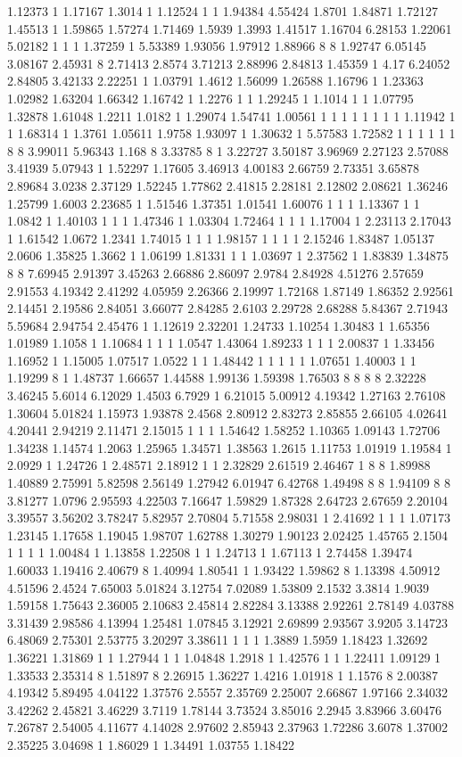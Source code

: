 1.12373 1 1.17167 1.3014 1 1.12524 1 1 1.94384 4.55424 1.8701 1.84871 1.72127 1.45513 1 1.59865 1.57274 1.71469 1.5939 1.3993 1.41517 1.16704 6.28153 1.22061 5.02182 1 1 1 1.37259 1 5.53389 1.93056 1.97912 1.88966 8 8 1.92747 6.05145 3.08167 2.45931 8 2.71413 2.8574 3.71213 2.88996 2.84813 1.45359 1 4.17 6.24052 2.84805 3.42133 2.22251 1 1.03791 1.4612 1.56099 1.26588 1.16796 1 1.23363 1.02982 1.63204 1.66342 1.16742 1 1.2276 1 1 1.29245 1 1.1014 1 1 1.07795 1.32878 1.61048 1.2211 1.0182 1 1.29074 1.54741 1.00561 1 1 1 1 1 1 1 1 1.11942 1 1 1.68314 1 1.3761 1.05611 1.9758 1.93097 1 1.30632 1 5.57583 1.72582 1 1 1 1 1 1 8 8 3.99011 5.96343 1.168 8 3.33785 8 1 3.22727 3.50187 3.96969 2.27123 2.57088 3.41939 5.07943 1 1.52297 1.17605 3.46913 4.00183 2.66759 2.73351 3.65878 2.89684 3.0238 2.37129 1.52245 1.77862 2.41815 2.28181 2.12802 2.08621 1.36246 1.25799 1.6003 2.23685 1 1.51546 1.37351 1.01541 1.60076 1 1 1 1.13367 1 1 1.0842 1 1.40103 1 1 1 1.47346 1 1.03304 1.72464 1 1 1 1.17004 1 2.23113 2.17043 1 1.61542 1.0672 1.2341 1.74015 1 1 1 1.98157 1 1 1 1 2.15246 1.83487 1.05137 2.0606 1.35825 1.3662 1 1.06199 1.81331 1 1 1.03697 1 2.37562 1 1.83839 1.34875 8 8 7.69945 2.91397 3.45263 2.66886 2.86097 2.9784 2.84928 4.51276 2.57659 2.91553 4.19342 2.41292 4.05959 2.26366 2.19997 1.72168 1.87149 1.86352 2.92561 2.14451 2.19586 2.84051 3.66077 2.84285 2.6103 2.29728 2.68288 5.84367 2.71943 5.59684 2.94754 2.45476 1 1.12619 2.32201 1.24733 1.10254 1.30483 1 1.65356 1.01989 1.1058 1 1.10684 1 1 1 1.0547 1.43064 1.89233 1 1 1 2.00837 1 1.33456 1.16952 1 1.15005 1.07517 1.0522 1 1 1.48442 1 1 1 1 1 1.07651 1.40003 1 1 1.19299 8 1 1.48737 1.66657 1.44588 1.99136 1.59398 1.76503 8 8 8 8 2.32228 3.46245 5.6014 6.12029 1.4503 6.7929 1 6.21015 5.00912 4.19342 1.27163 2.76108 1.30604 5.01824 1.15973 1.93878 2.4568 2.80912 2.83273 2.85855 2.66105 4.02641 4.20441 2.94219 2.11471 2.15015 1 1 1 1.54642 1.58252 1.10365 1.09143 1.72706 1.34238 1.14574 1.2063 1.25965 1.34571 1.38563 1.2615 1.11753 1.01919 1.19584 1 2.0929 1 1.24726 1 2.48571 2.18912 1 1 2.32829 2.61519 2.46467 1 8 8 1.89988 1.40889 2.75991 5.82598 2.56149 1.27942 6.01947 6.42768 1.49498 8 8 1.94109 8 8 3.81277 1.0796 2.95593 4.22503 7.16647 1.59829 1.87328 2.64723 2.67659 2.20104 3.39557 3.56202 3.78247 5.82957 2.70804 5.71558 2.98031 1 2.41692 1 1 1 1.07173 1.23145 1.17658 1.19045 1.98707 1.62788 1.30279 1.90123 2.02425 1.45765 2.1504 1 1 1 1 1.00484 1 1.13858 1.22508 1 1 1.24713 1 1.67113 1 2.74458 1.39474 1.60033 1.19416 2.40679 8 1.40994 1.80541 1 1.93422 1.59862 8 1.13398 4.50912 4.51596 2.4524 7.65003 5.01824 3.12754 7.02089 1.53809 2.1532 3.3814 1.9039 1.59158 1.75643 2.36005 2.10683 2.45814 2.82284 3.13388 2.92261 2.78149 4.03788 3.31439 2.98586 4.13994 1.25481 1.07845 3.12921 2.69899 2.93567 3.9205 3.14723 6.48069 2.75301 2.53775 3.20297 3.38611 1 1 1 1.3889 1.5959 1.18423 1.32692 1.36221 1.31869 1 1 1.27944 1 1 1.04848 1.2918 1 1.42576 1 1 1.22411 1.09129 1 1.33533 2.35314 8 1.51897 8 2.26915 1.36227 1.4216 1.01918 1 1.1576 8 2.00387 4.19342 5.89495 4.04122 1.37576 2.5557 2.35769 2.25007 2.66867 1.97166 2.34032 3.42262 2.45821 3.46229 3.7119 1.78144 3.73524 3.85016 2.2945 3.83966 3.60476 7.26787 2.54005 4.11677 4.14028 2.97602 2.85943 2.37963 1.72286 3.6078 1.37002 2.35225 3.04698 1 1.86029 1 1.34491 1.03755 1.18422 